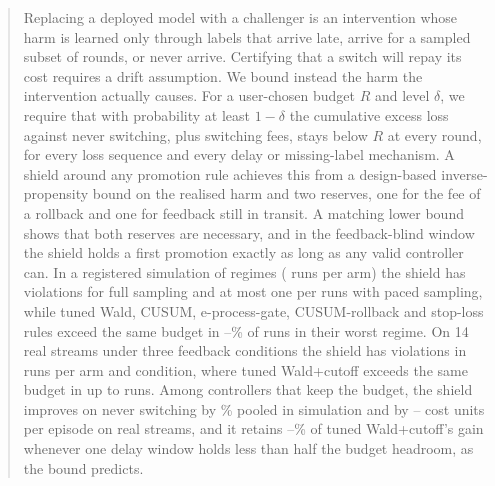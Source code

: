 \documentclass{article}
\theoremstyle{plain}
\theoremstyle{definition}
\begin{document}
\printAffiliationsAndNotice{}

\begin{abstract}
Replacing a deployed model with a challenger is an intervention whose harm is learned only through labels that arrive late, arrive for a sampled subset of rounds, or never arrive.
Certifying that a switch will repay its cost requires a drift assumption.
We bound instead the harm the intervention actually causes.
For a user-chosen budget $R$ and level $\delta$, we require that with probability at least $1-\delta$ the cumulative excess loss against never switching, plus switching fees, stays below $R$ at every round, for every loss sequence and every delay or missing-label mechanism.
A shield around any promotion rule achieves this from a design-based inverse-propensity bound on the realised harm and two reserves, one for the fee of a rollback and one for feedback still in transit.
A matching lower bound shows that both reserves are necessary, and in the feedback-blind window the shield holds a first promotion exactly as long as any valid controller can.
In a registered simulation of \NRegimes{} regimes (\NRunsPerArm{} runs per arm) the shield has \COneTotal{} violations for full sampling and at most one per \NRunsPerArm{} runs with paced sampling, while tuned Wald, CUSUM, e-process-gate, CUSUM-rollback and stop-loss rules exceed the same budget in \CThreeMinWorst--\CThreeMaxWorst\% of runs in their worst regime.
On 14 real streams under three feedback conditions the shield has \RealShieldViolClean{} violations in \RealRunsPerArm{} runs per arm and condition, where tuned Wald+cutoff exceeds the same budget in up to \RealMaxExceed{} runs.
Among controllers that keep the budget, the shield improves on never switching by \SimVsNeverPct\% pooled in simulation and by \RealVsNeverMin--\RealVsNeverMax{} cost units per episode on real streams, and it retains \KeepLo--\KeepHi\% of tuned Wald+cutoff's gain whenever one delay window holds less than half the budget headroom, as the bound predicts.
\end{abstract}
\end{document}
